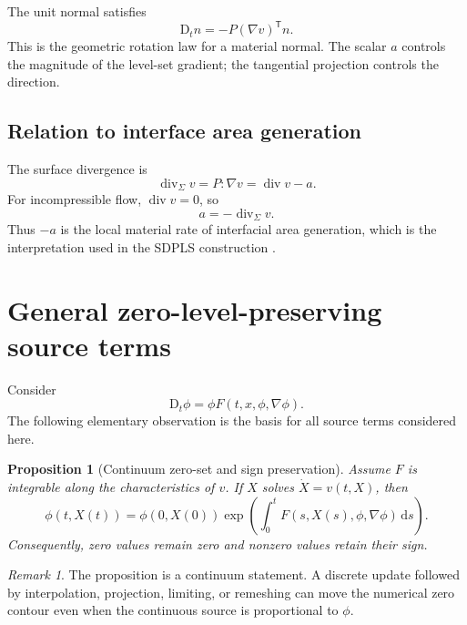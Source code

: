 \documentclass[11pt,a4paper]{article}
\newtheorem{proposition}[theorem]{Proposition}
\theoremstyle{definition}
\theoremstyle{remark}
\newtheorem{remark}[theorem]{Remark}
\newcommand{\Div}{\operatorname{div}}
\newcommand{\material}{\mathrm{D}_t}
\begin{document}
The unit normal satisfies
\begin{equation}
  \material n=-P(\nabla v)^{\mathsf T}n.
  \label{eq:normal-evolution}
\end{equation}
This is the geometric rotation law for a material normal. The scalar $a$ controls the magnitude of the level-set gradient; the tangential projection controls the direction.

\subsection{Relation to interface area generation}

The surface divergence is
\begin{equation}
  \Div_{\Sigma}v=P:\nabla v=\Div v-a.
\end{equation}
For incompressible flow, $\Div v=0$, so
\begin{equation}
  a=-\Div_{\Sigma}v.
\end{equation}
Thus $-a$ is the local material rate of interfacial area generation, which is the interpretation used in the SDPLS construction \cite{FrickeEtAl2022}.

\section{General zero-level-preserving source terms}

Consider
\begin{equation}
  \material\phi=\phi F(t,x,\phi,\nabla\phi).
  \label{eq:general-source}
\end{equation}
The following elementary observation is the basis for all source terms considered here.

\begin{proposition}[Continuum zero-set and sign preservation]
Assume $F$ is integrable along the characteristics of $v$. If $X$ solves $\dot X=v(t,X)$, then
\begin{equation}
  \phi(t,X(t))=\phi(0,X(0))
  \exp\left(\int_0^t F(s,X(s),\phi,\nabla\phi)\,\mathrm ds\right).
  \label{eq:char-solution}
\end{equation}
Consequently, zero values remain zero and nonzero values retain their sign.
\end{proposition}

\begin{remark}
The proposition is a continuum statement. A discrete update followed by interpolation, projection, limiting, or remeshing can move the numerical zero contour even when the continuous source is proportional to $\phi$.
\end{remark}
\end{document}
